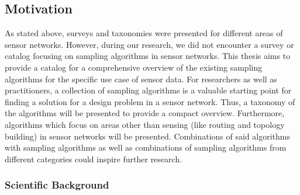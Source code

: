 \subsection{Motivation}
\label{sec:motivation}

As stated above, surveys and taxonomies were presented for different areas of sensor networks. However, during our research, we did not encounter a survey or catalog focusing on sampling algorithms in sensor networks. This thesis aims to provide a catalog for a comprehensive overview of the existing sampling algorithms for the specific use case of sensor data. For researchers as well as practitioners, a collection of sampling algorithms is a valuable starting point for finding a solution for a design problem in a sensor network. Thus, a taxonomy of the algorithms will be presented to provide a compact overview. Furthermore, algorithms which focus on areas other than sensing (like routing and topology building) in sensor networks will be presented. Combinations of said algorithms with sampling algorithms as well as combinations of sampling algorithms from different categories could inspire further research.

\subsubsection{Scientific Background}
\label{sec:Scientific Background}

